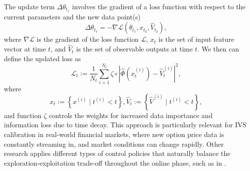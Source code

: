 \documentclass[sigconf, authorversion=true, nonacm=true]{acmart}
\begin{document}
The update term $\Delta\theta_{t_1}$ involves the gradient of a loss function with respect to the current parameters and the new data point(s)
\begin{equation}
\Delta\theta_{t_1} = -\nabla \mathcal{L}(\theta_{t_1}, x_{t_2}, \widehat{V}_{t_2}),
\end{equation}
where $\nabla \mathcal{L}$ is the gradient of the loss function $\mathcal{L}$, $x_t$ is the set of input feature vector at time $t$, and $\widehat{V}_t$ is the set of observable outputs at time $t$. We then can define the updated loss as
\begin{equation}
    \mathcal{L}_t := \frac{1}{N_t} \sum_{i=1}^{N_t} \zeta \circ \left| \widehat{\Phi}(x_t^{(i)}) - \widehat{V}_t^{(i)} \right|^2,
\end{equation}
where
\begin{equation}
    x_t:=\left\{x^{(i)} \mid t^{(i)}<t\right\}, \widehat{V}_t:=\left\{\widehat{V}^{(i)} \mid t^{(i)}<t\right\},
\end{equation}
and function $\zeta$ controls the weights for increased data importance and information loss due to time decay. This approach is particularly relevant for IVS calibration in real-world financial markets, where new option price data is constantly streaming in, and market conditions can change rapidly. Other research applies different types of control policies that naturally balance the exploration-exploitation trade-off throughout the online phase, such as in \cite{waldon2024dare}.
\end{document}
